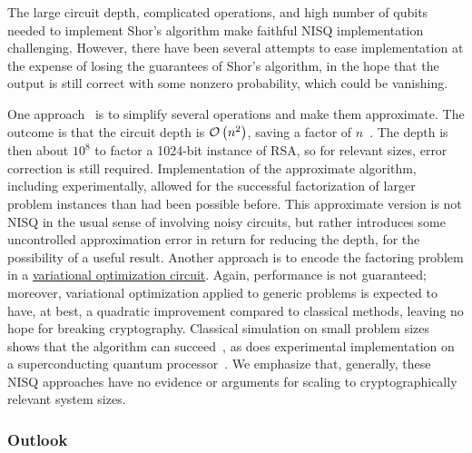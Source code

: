 \begin{refsection}
The large circuit depth, complicated operations, and high number of qubits needed to implement Shor's algorithm make faithful NISQ implementation challenging. However, there have been several attempts to ease implementation at the expense of losing the guarantees of Shor's algorithm, in the hope that the output is still correct with some nonzero probability, which could be vanishing.

One approach~\cite{rossi2022ReducedShor} is to simplify several operations and make them approximate. The outcome is that the circuit depth is $\mathcal{O}\left( n^2 \right)$, saving a factor of $n$~\cite{haner2017factoringToffolis}. The depth is then about $10^8$ to factor a 1024-bit instance of RSA, so for relevant sizes, error correction is still required. Implementation of the approximate algorithm, including experimentally, allowed for the successful factorization of larger problem instances than had been possible before. This approximate version is not NISQ in the usual sense of involving noisy circuits, but rather introduces some uncontrolled approximation error in return for reducing the depth, for the possibility of a useful result. Another approach is to encode the factoring problem in a \hyperref[prim:VQA]{variational optimization circuit}. Again, performance is not guaranteed; moreover, variational optimization applied to generic problems is expected to have, at best, a quadratic improvement compared to classical methods, leaving no hope for breaking cryptography. Classical simulation on small problem sizes shows that the algorithm can succeed~\cite{anschuetz2019variationalfactoring}, as does experimental implementation on a superconducting quantum processor~\cite{karamlou2021VariationalFactoringSuperconducting}. We emphasize that, generally, these NISQ approaches have no evidence or arguments for scaling to cryptographically relevant system sizes.

\subsubsection*{Outlook}


\end{refsection}
